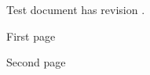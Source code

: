 \documentclass{article}
\begin{document}
Test document has revision \RCSRevision.

First page                      %

\newpage{}

Second page                     %
\end{document}
